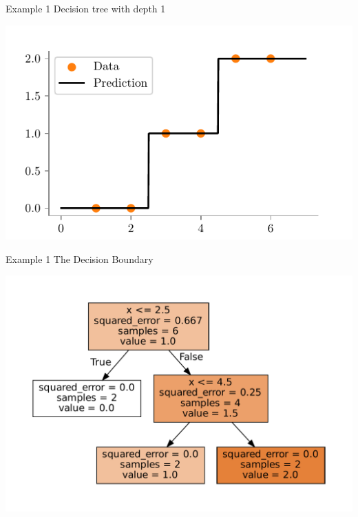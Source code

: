 \documentclass{beamer}
\begin{document}
\begin{frame}{Example 1}
	Decision tree with depth 1
	\begin{center}
	\includegraphics{../figures/decision-trees/ri-ro-depth-2.pdf}	
	\end{center}
	\end{frame}
	
	\begin{frame}{Example 1}
	The Decision Boundary
	\begin{center}
	\includegraphics{../figures/decision-trees/ri-ro-depth-2-sklearn.pdf}
	\end{center}
	\end{frame}
	
\end{document}
